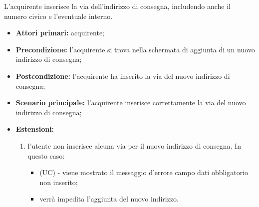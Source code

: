 L'acquirente inserisce la via dell'indirizzo di consegna, includendo anche il numero civico e l'eventuale interno.
\begin{itemize}
    \item \textbf{Attori primari:} acquirente;
    \item \textbf{Precondizione:} l'acquirente si trova nella schermata di aggiunta di un nuovo indirizzo di consegna;
    \item \textbf{Postcondizione:} l'acquirente ha inserito la via del nuovo indirizzo di consegna;
    \item \textbf{Scenario principale:} l'acquirente inserisce correttamente la via del nuovo indirizzo di consegna;
    \item \textbf{Estensioni:}
    \begin{enumerate}[label=\lett]
        \item l'utente non inserisce alcuna via per il nuovo indirizzo di consegna. In questo caso:
        \begin{itemize}
            \item (UC) - viene mostrato il messaggio d'errore campo dati obbligatorio non inserito;
            \item verrà impedita l'aggiunta del nuovo indirizzo.
        \end{itemize}
    \end{enumerate}
\end{itemize}

